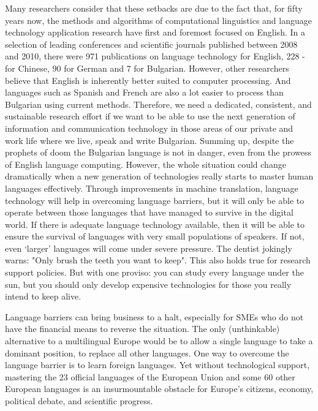 \begin{multicols}{2}
Many researchers consider that these setbacks are due to the fact that, for fifty years now, the methods and algorithms of computational linguistics and language technology application research have first and foremost focused on English. In a selection of leading conferences and scientific journals published between 2008 and 2010, there were 971 publications on language technology for English, 228 - for Chinese, 90 for German and 7 for Bulgarian. However, other researchers believe that English is inherently better suited to computer processing. And languages such as Spanish and French are also a lot easier to process than Bulgarian using current methods.
Therefore, we need a dedicated, consistent, and sustainable research effort if we want to be able to use the next generation of information and communication technology in those areas of our private and work life where we live, speak and write Bulgarian.
Summing up, despite the prophets of doom the Bulgarian language is not in danger, even from the prowess of English language computing. However, the whole situation could change dramatically when a new generation of technologies really starts to master human languages effectively. 
Through improvements in machine translation, language technology will help in overcoming language barriers, but it will only be able to operate between those languages that have managed to survive in the digital world. If there is adequate language technology available, then it will be able to ensure the survival of languages with very small populations of speakers. If not, even ‘larger’ languages will come under severe pressure. 
The dentist jokingly warns: "Only brush the teeth you want to keep". This also holds true for research support policies. But with one proviso: you can study every language under the sun, but you should only develop expensive technologies for those you really intend to keep alive.  


  Language barriers can bring business to a halt, especially for SMEs who do not have the financial means to reverse the situation. The only (unthinkable) alternative to a multilingual Europe would be to allow a single language to take a dominant position, to replace all other languages. One way to overcome the language barrier is to learn foreign languages. Yet without technological support, mastering the 23 official languages of the European Union and some 60 other European languages is an insurmountable obstacle for Europe’s citizens, economy, political debate, and scientific progress.


\end{multicols}

